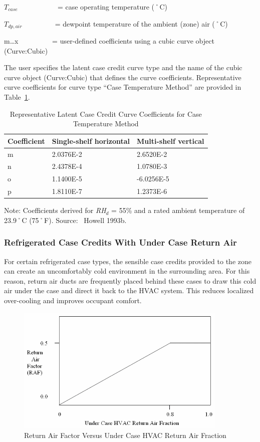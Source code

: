 \({T_{case}}\) ~~~~~~~~~~ = case operating temperature (˚C)

\({T_{dp,air}}\) ~~~~~~~~ = dewpoint temperature of the ambient (zone) air (˚C)

m\ldots{}x~~~~~~~~~ = user-defined coefficients using a cubic curve object (Curve:Cubic)

The user specifies the latent case credit curve type and the name of the cubic curve object (Curve:Cubic) that defines the curve coefficients. Representative curve coefficients for curve type ``Case Temperature Method'' are provided in Table~\ref{table:representative-latent-case-credit-curve}.

\begin{longtable}[c]{@{}lll@{}}
\caption{Representative Latent Case Credit Curve Coefficients for Case Temperature Method \protect \label{table:representative-latent-case-credit-curve}}\\
\toprule 
Coefficient & Single-shelf horizontal & Multi-shelf vertical \tabularnewline \midrule
\endhead
m & 2.0376E-2 & 2.6520E-2 \tabularnewline
n & 2.4378E-4 & 1.0780E-3 \tabularnewline
o & 1.1400E-5 & -6.0256E-5 \tabularnewline
p & 1.8110E-7 & 1.2373E-6 \tabularnewline
\bottomrule
\end{longtable}

Note: Coefficients derived for \emph{RH\(_{d}\)} = 55\% and a rated ambient temperature of 23.9˚C (75˚F). Source:~ Howell 1993b.

\subsubsection{Refrigerated Case Credits With Under Case Return Air}\label{refrigerated-case-credits-with-under-case-return-air}

For certain refrigerated case types, the sensible case credits provided to the zone can create an uncomfortably cold environment in the surrounding area. For this reason, return air ducts are frequently placed behind these cases to draw this cold air under the case and direct it back to the HVAC system. This reduces localized over-cooling and improves occupant comfort.

\begin{figure}[hbtp] %
\centering
\includegraphics[width=0.9\textwidth, height=0.9\textheight, keepaspectratio=true]{media/image6247.png}
\caption{Return Air Factor Versus Under Case HVAC Return Air Fraction \protect \label{fig:return-air-factor-versus-under-case-hvac}}
\end{figure}

